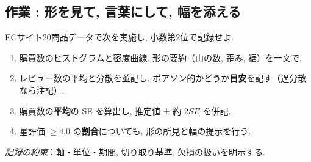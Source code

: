   \subsection*{作業 : 形を見て, 言葉にして, 幅を添える}
    ECサイト20商品データで次を実施し, 小数第2位で記録せよ.
    \begin{enumerate}
      \item 購買数のヒストグラムと密度曲線. 形の要約（山の数, 歪み, 裾）を一文で.
      \item レビュー数の平均と分散を並記し, ポアソン的かどうか\textbf{目安}を記す（過分散なら注記）.
      \item 購買数の\textbf{平均}の SE を算出し, 推定値 ± 約 $2SE$ を併記.
      \item 星評価 $\ge 4.0$ の\textbf{割合}についても, 形の所見と幅の提示を行う.
    \end{enumerate}
    \textit{記録の約束}：軸・単位・期間, 切り取り基準, 欠損の扱いを明示する.






